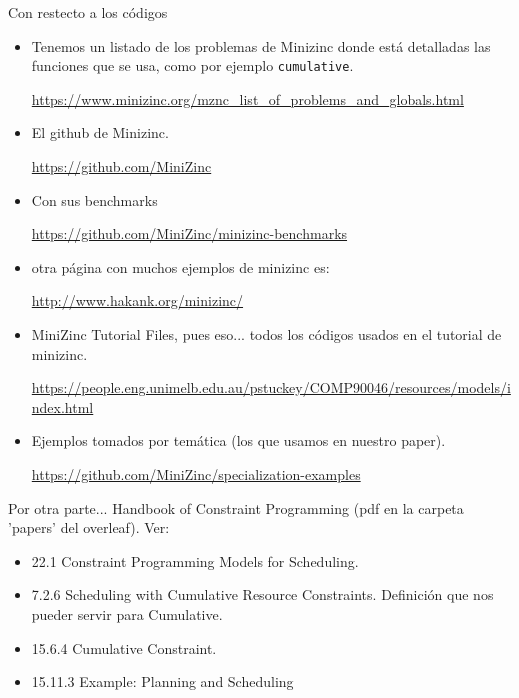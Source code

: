 Con restecto a los códigos

\begin{itemize}
    \item Tenemos un listado de los problemas de Minizinc donde está detalladas las funciones que se usa, como por ejemplo \texttt{cumulative}.

\url{https://www.minizinc.org/mznc_list_of_problems_and_globals.html}

    \item El github de Minizinc.

\url{https://github.com/MiniZinc}

    \item Con sus benchmarks

\url{https://github.com/MiniZinc/minizinc-benchmarks}

    \item otra página con muchos ejemplos de minizinc es:

\url{http://www.hakank.org/minizinc/}

    \item MiniZinc Tutorial Files, pues eso... todos los códigos usados en el tutorial de minizinc.

\url{https://people.eng.unimelb.edu.au/pstuckey/COMP90046/resources/models/index.html}

\item Ejemplos tomados por temática (los que usamos en nuestro paper).

\url{https://github.com/MiniZinc/specialization-examples}

\end{itemize}





Por otra parte...
Handbook of Constraint Programming \cite{GlobalConstraints}
(pdf en la carpeta 'papers' del overleaf). Ver:

\begin{itemize}
    \item 22.1 Constraint Programming Models for Scheduling.

    \item 7.2.6 Scheduling with Cumulative Resource Constraints. Definición que nos pueder servir para Cumulative. 

    \item 15.6.4 Cumulative Constraint.

    \item 15.11.3 Example: Planning and Scheduling

\end{itemize}


